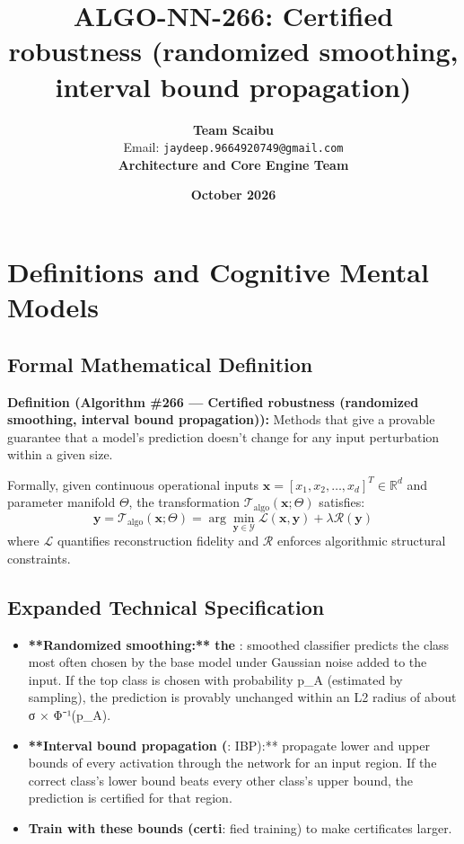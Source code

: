 \documentclass[11pt,a4paper]{article}
\title{\textbf{ALGO-NN-266: Certified robustness (randomized smoothing, interval bound propagation)}}
\author{\textbf{Team Scaibu} \\ \small Email: \texttt{jaydeep.9664920749@gmail.com} \\ \small \textbf{Architecture and Core Engine Team}}
\date{\textbf{October 2026}}
\theoremstyle{definition}
\begin{document}
\maketitle

\section{Definitions and Cognitive Mental Models}

\subsection{Formal Mathematical Definition}
\textbf{Definition (Algorithm \#266 --- Certified robustness (randomized smoothing, interval bound propagation)):}
Methods that give a provable guarantee that a model's prediction doesn't change for any input perturbation within a given size.

Formally, given continuous operational inputs $\mathbf{x} = [x_1, x_2, \dots, x_d]^T \in \mathbb{R}^d$ and parameter manifold $\Theta$, the transformation $\mathcal{T}_{\text{algo}}(\mathbf{x}; \Theta)$ satisfies:
{\boldmath
\begin{equation}
\mathbf{y} = \mathcal{T}_{\text{algo}}(\mathbf{x}; \Theta) = \arg\min_{\mathbf{y} \in \mathcal{Y}} \mathcal{L}(\mathbf{x}, \mathbf{y}) + \lambda \mathcal{R}(\mathbf{y})
\end{equation}
}
where $\mathcal{L}$ quantifies reconstruction fidelity and $\mathcal{R}$ enforces algorithmic structural constraints.

\subsection{Expanded Technical Specification}
\begin{itemize}
\item \textbf{**Randomized smoothing:** the }: smoothed classifier predicts the class most often chosen by the base model under Gaussian noise added to the input. If the top class is chosen with probability p\_A (estimated by sampling), the prediction is provably unchanged within an L2 radius of about σ × Φ⁻¹(p\_A).
\item \textbf{**Interval bound propagation (}: IBP):** propagate lower and upper bounds of every activation through the network for an input region. If the correct class's lower bound beats every other class's upper bound, the prediction is certified for that region.
\item \textbf{Train with these bounds (certi}: fied training) to make certificates larger.
\end{itemize}
\end{document}
